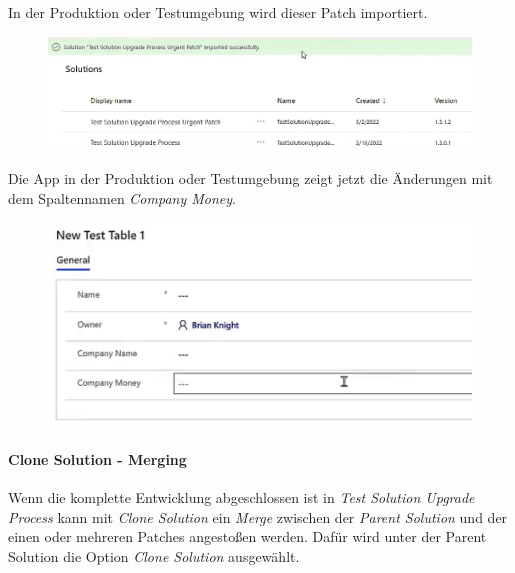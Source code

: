 In der Produktion oder Testumgebung wird dieser Patch importiert.
\begin{figure}[H]
	\centering
	\includegraphics[scale = 0.3]{attachment/chapter_13/Scc046}
\end{figure}


Die App in der Produktion oder Testumgebung zeigt jetzt die Änderungen mit dem Spaltennamen \textit{Company Money}.
\begin{figure}[H]
	\centering
	\includegraphics[scale = 0.3]{attachment/chapter_13/Scc047}
\end{figure}


\paragraph{Clone Solution - Merging}

Wenn die komplette Entwicklung abgeschlossen ist in \textit{Test Solution Upgrade Process} kann mit \textit{Clone Solution} ein \textit{Merge} zwischen der \textit{Parent Solution} und der einen oder mehreren Patches angestoßen werden. Dafür wird unter der Parent Solution die Option \textit{Clone Solution} ausgewählt.

